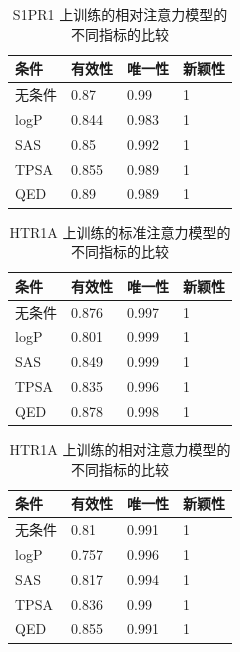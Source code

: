 \begin{table}[H]
  \centering
  \caption{S1PR1 上训练的相对注意力模型的不同指标的比较}
  \label{tab:6}
  \begin{tabular}{llll}
    \hline 条件 & 有效性 & 唯一性 & 新颖性 \\
    \hline 无条件 & 0.87 & 0.99 & 1 \\
    logP & 0.844 & 0.983 & 1 \\
    SAS & 0.85 & 0.992 & 1 \\
    TPSA & 0.855 & 0.989 & 1 \\
    QED & 0.89 & 0.989 & 1 \\
    \hline
    \end{tabular}
\end{table}

\begin{table}[H]
  \centering
  \caption{HTR1A 上训练的标准注意力模型的不同指标的比较}
  \label{tab:7}
  \begin{tabular}{llll}
    \hline 条件 & 有效性 & 唯一性 & 新颖性 \\
    \hline 无条件 & 0.876 & 0.997 & 1 \\
    logP & 0.801 & 0.999 & 1 \\
    SAS & 0.849 & 0.999 & 1 \\
    TPSA & 0.835 & 0.996 & 1 \\
    QED & 0.878 & 0.998 & 1 \\
    \hline
    \end{tabular}
\end{table}

\begin{table}[H]
  \centering
  \caption{HTR1A 上训练的相对注意力模型的不同指标的比较}
  \label{tab:8}
  \begin{tabular}{llll}
    \hline 条件 & 有效性 & 唯一性 & 新颖性 \\
    \hline 无条件 & 0.81 & 0.991 & 1 \\
    logP & 0.757 & 0.996 & 1 \\
    SAS & 0.817 & 0.994 & 1 \\
    TPSA & 0.836 & 0.99 & 1 \\
    QED & 0.855 & 0.991 & 1 \\
    \hline
    \end{tabular}
\end{table}

